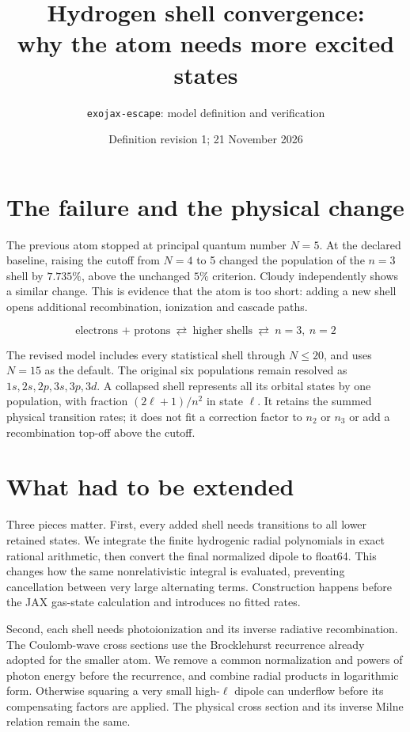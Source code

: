 \documentclass[10pt,a4paper]{article}
\title{Hydrogen shell convergence:\\why the atom needs more excited states}
\author{\texttt{exojax-escape}: model definition and verification}
\date{Definition revision 1; 21 November 2026}
\begin{document}
\maketitle

\section{The failure and the physical change}
The previous atom stopped at principal quantum number $N=5$. At the declared
baseline, raising the cutoff from $N=4$ to 5 changed the population of the
$n=3$ shell by $7.735\%$, above the unchanged $5\%$ criterion. Cloudy independently
shows a similar change. This is evidence that the atom is too short: adding a
new shell opens additional recombination, ionization and cascade paths.

\[
\boxed{\text{electrons + protons}}
\ \rightleftarrows\ \boxed{\text{higher shells}}
\ \rightleftarrows\ \boxed{n=3,\ n=2}
\]

The revised model includes every statistical shell through $N\le20$, and uses
$N=15$ as the default. The original six populations remain resolved as
$1s,2s,2p,3s,3p,3d$. A collapsed shell represents all its orbital states by one
population, with fraction $(2\ell+1)/n^2$ in state $\ell$. It retains the summed
physical transition rates; it does not fit a correction factor to $n_2$ or
$n_3$ or add a recombination top-off above the cutoff.

\section{What had to be extended}
Three pieces matter. First, every added shell needs transitions to all lower
retained states. We integrate the finite hydrogenic radial polynomials in
exact rational arithmetic, then convert the final normalized dipole to
float64. This changes how the same nonrelativistic integral is evaluated,
preventing cancellation between very large alternating terms. Construction
happens before the JAX gas-state calculation and introduces no fitted rates.

Second, each shell needs photoionization and its inverse radiative
recombination. The Coulomb-wave cross sections use the Brocklehurst recurrence
already adopted for the smaller atom. We remove a common normalization and
powers of photon energy before the recurrence, and combine radial products
in logarithmic form. Otherwise squaring a very small high-$\ell$ dipole can
underflow before its compensating factors are applied. The physical cross
section and its inverse Milne relation remain the same.
\end{document}
